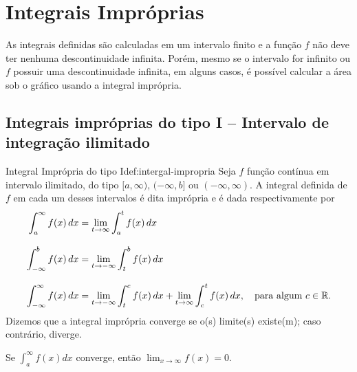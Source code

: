 \section{Integrais Impróprias}
\label{sec:Integrais_Improprias}

As integrais definidas são calculadas em um intervalo finito e a função $f$
não deve ter nenhuma descontinuidade infinita. Porém, mesmo se o intervalo
for infinito ou $f$ possuir uma descontinuidade infinita, em alguns casos,
é possível calcular a área sob o gráfico usando a integral imprópria.

\subsection{Integrais impróprias do tipo I -- Intervalo de integração ilimitado}

\begin{definicao}{Integral Imprópria do tipo I}{def:intergal-impropria}
  Seja $f$ função contínua em intervalo ilimitado, do tipo
  $[a, \infty)$,
  $(-\infty, b]$ ou
  $(-\infty, \infty)$.
  A integral definida de $f$ em cada
  um desses intervalos é dita imprópria e é dada respectivamente por
  \begin{align*}
    \int_a^{\infty} f(x)                  \, dx
    & = \lim_{t\to\infty} \int_a^t f(x)   \, dx \\[3mm]
        \int_{-\infty}^b f(x)             \, dx
    & = \lim_{t\to-\infty} \int_t^b f(x)  \, dx \\[3mm]
        \int_{-\infty}^{\infty} f(x)      \, dx
    & = \lim_{t\to-\infty} \int_t^c f(x)  \, dx
      + \lim_{t \to \infty} \int_c^t f(x) \, dx,
        \quad \text{para algum } c \in \mathbb{R}.
  \end{align*}
  Dizemos que a integral imprópria converge se o(s) limite(s) existe(m);
  caso contrário, diverge.
\end{definicao}

Se \(\int_a^{\infty} f(x) dx\)
converge, então \(\lim_{x \to \infty} f(x) = 0\).

